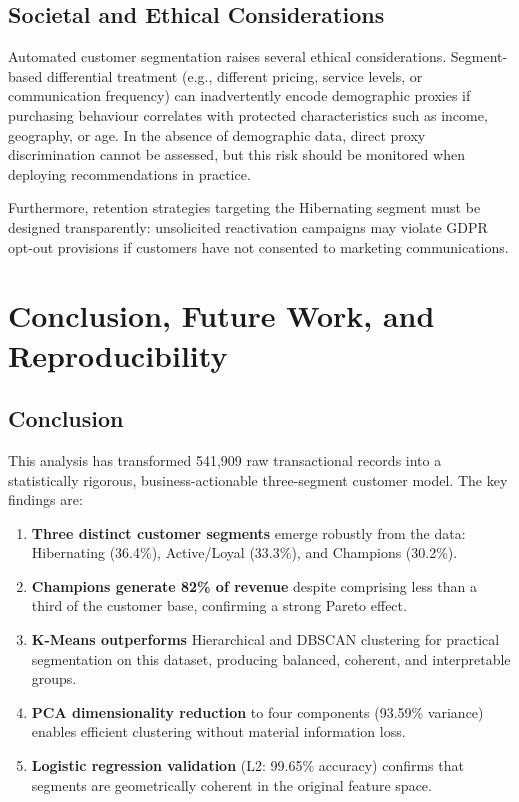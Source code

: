 \documentclass[12pt,a4paper]{article}
\begin{document}
\subsection{Societal and Ethical Considerations}

Automated customer segmentation raises several ethical considerations.  Segment-based
differential treatment (e.g., different pricing, service levels, or communication
frequency) can inadvertently encode demographic proxies if purchasing behaviour
correlates with protected characteristics such as income, geography, or age.
In the absence of demographic data, direct proxy discrimination cannot be assessed,
but this risk should be monitored when deploying recommendations in practice.

Furthermore, retention strategies targeting the Hibernating segment must be designed
transparently: unsolicited reactivation campaigns may violate GDPR opt-out provisions
if customers have not consented to marketing communications.

\section{Conclusion, Future Work, and Reproducibility}

\subsection{Conclusion}

This analysis has transformed 541,909 raw transactional records into a statistically
rigorous, business-actionable three-segment customer model.  The key findings are:

\begin{enumerate}[leftmargin=*]
  \item \textbf{Three distinct customer segments} emerge robustly from the data:
        Hibernating (36.4\%), Active/Loyal (33.3\%), and Champions (30.2\%).
  \item \textbf{Champions generate 82\% of revenue} despite comprising less than a
        third of the customer base, confirming a strong Pareto effect.
  \item \textbf{K-Means outperforms} Hierarchical and DBSCAN clustering for practical
        segmentation on this dataset, producing balanced, coherent, and interpretable groups.
  \item \textbf{PCA dimensionality reduction} to four components (93.59\% variance)
        enables efficient clustering without material information loss.
  \item \textbf{Logistic regression validation} (L2: 99.65\% accuracy) confirms that
        segments are geometrically coherent in the original feature space.
\end{enumerate}
\end{document}
